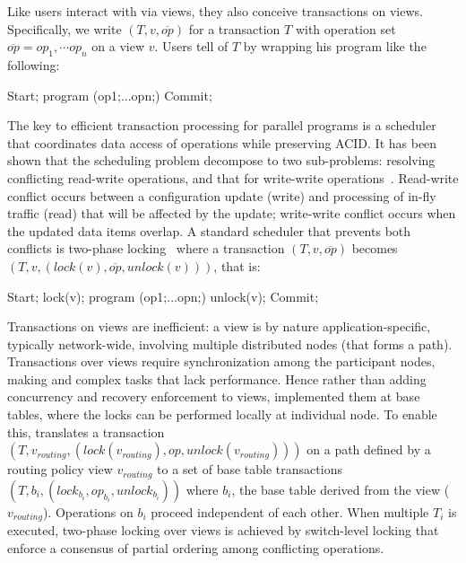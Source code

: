 Like users interact with \Sys via views, they also conceive
transactions on views. Specifically, we write $(T,v, \overline{op})$
for a transaction $T$ with operation set $\overline{op}=op_1,\cdots
op_n$ on a view $v$.  Users tell \Sys of $T$ by wrapping his program
like the following:
\begin{sql}
Start; program (op1;...opn;) Commit;
\end{sql}
The key to efficient transaction processing for parallel programs is a
scheduler that coordinates data access of operations while preserving
ACID. It has been shown that the scheduling problem decompose to two
sub-problems: resolving conflicting read-write operations, and that
for write-write operations~\cite{Bernstein:concurrency-recovery}.
Read-write conflict occurs between a configuration update (write) and
processing of in-fly traffic (read) that will be affected by the
update; write-write conflict occurs when the updated data items
overlap. A standard scheduler that prevents both conflicts is
two-phase locking~\cite{Bernstein:concurrency-recovery} where a
transaction $(T,v,\overline{op})$ becomes $(T,v, (lock(v),
\overline{op}, unlock(v)))$, that is:
\begin{sql}
Start; lock(v); program (op1;...opn;) unlock(v); Commit;
\end{sql}

 Transactions on
views are inefficient: a view is by nature application-specific,
typically network-wide, involving multiple distributed nodes (\eg that
forms a path).  Transactions over views require synchronization among
the participant nodes, making  and  complex
tasks that lack performance.  Hence rather than adding concurrency and
recovery enforcement to views, \Sys implemented them at base tables,
where the locks can be performed locally at individual node.  To
enable this, \Sys translates a transaction $(T,v_{routing},
(lock(v_{routing}),op,unlock(v_{routing})))$ on a path defined by a
routing policy view $v_{routing}$ to a set of base table transactions
$(T,b_i, (lock_{b_i}, op_{b_i}, unlock_{b_i})) $ where $b_i$, the base
table derived from the view
($v_{routing}$). 
Operations on $b_i$ proceed independent of each other. When multiple
$T_i$ is executed, two-phase locking over views is achieved by
switch-level locking that enforce a consensus of partial ordering
among conflicting operations.



